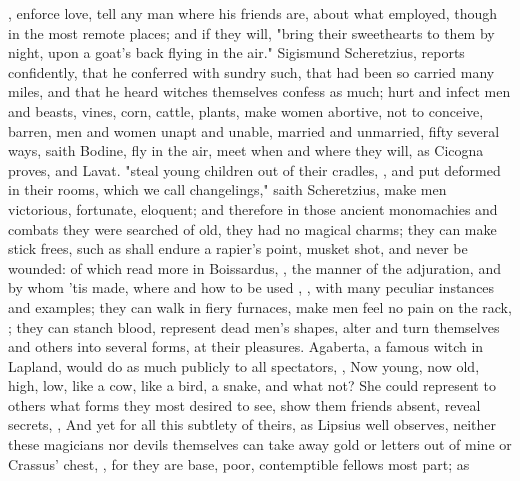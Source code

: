 , enforce love, tell any man
where his friends are, about what employed, though in the most remote places;
and if they will, "bring their sweethearts to them by
night, upon a goat's back flying in the air." Sigismund Scheretzius,
 reports confidently, that he
conferred with sundry such, that had been so carried many miles, and that he
heard witches themselves confess as much; hurt and infect men and beasts,
vines, corn, cattle, plants, make women abortive, not to conceive,
barren, men and women unapt and unable, married and
unmarried, fifty several ways, saith Bodine,  fly in the air, meet when and where they will, as Cicogna proves, and
Lavat.  "steal young children
out of their cradles, , and put deformed in their
rooms, which we call changelings," saith Scheretzius,
 make men victorious, fortunate, eloquent;
and therefore in those ancient monomachies and combats they were searched of
old, they had no magical charms; they can make
stick frees, such as shall endure a rapier's point, musket
shot, and never be wounded: of which read more in Boissardus,
, the manner of the adjuration, and by
whom 'tis made, where and how to be used , \etc{}, with many peculiar instances and examples; they can
walk in fiery furnaces, make men feel no pain on the rack, ; they can stanch blood, represent dead
men's shapes, alter and turn themselves and others into several forms, at their
pleasures. Agaberta, a famous witch in Lapland, would do
as much publicly to all spectators, , \etc{} Now young, now old, high, low,
like a cow, like a bird, a snake, and what not? She could represent to others
what forms they most desired to see, show them friends absent, reveal secrets,
, \etc{} And yet for all this subtlety of theirs,
as Lipsius well observes,  neither these magicians nor devils themselves can take away gold or
letters out of mine or Crassus' chest, , for
they are base, poor, contemptible fellows most part; as
